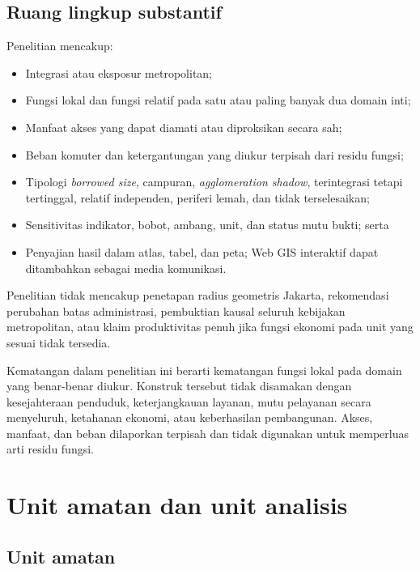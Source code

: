 \documentclass[11pt,a4paper,oneside,openany,indonesian]{report}
\begin{document}
\subsection{Ruang lingkup
substantif}\label{ruang-lingkup-substantif}

Penelitian mencakup:

\begin{itemize}
\tightlist
\item
  Integrasi atau eksposur metropolitan;
\item
  Fungsi lokal dan fungsi relatif pada satu atau paling banyak dua
  domain inti;
\item
  Manfaat akses yang dapat diamati atau diproksikan secara sah;
\item
  Beban komuter dan ketergantungan yang diukur terpisah dari residu
  fungsi;
\item
  Tipologi \emph{borrowed size}, campuran,
  \emph{agglomeration shadow}, terintegrasi tetapi tertinggal, relatif
  independen, periferi lemah, dan tidak terselesaikan;
\item
  Sensitivitas indikator, bobot, ambang, unit, dan status mutu bukti;
  serta
\item
  Penyajian hasil dalam atlas, tabel, dan peta; Web GIS interaktif dapat
  ditambahkan sebagai media komunikasi.
\end{itemize}

Penelitian tidak mencakup penetapan radius geometris Jakarta,
rekomendasi perubahan batas administrasi, pembuktian kausal seluruh
kebijakan metropolitan, atau klaim produktivitas penuh jika fungsi
ekonomi pada unit yang sesuai tidak tersedia.

Kematangan dalam penelitian ini berarti kematangan fungsi lokal pada
domain yang benar-benar diukur. Konstruk tersebut tidak disamakan dengan
kesejahteraan penduduk, keterjangkauan layanan, mutu pelayanan secara
menyeluruh, ketahanan ekonomi, atau keberhasilan pembangunan. Akses,
manfaat, dan beban dilaporkan terpisah dan tidak digunakan untuk
memperluas arti residu fungsi.

\section{Unit amatan dan unit
analisis}\label{unit-amatan-dan-unit-analisis}

\subsection{Unit amatan}\label{unit-amatan}
\end{document}
